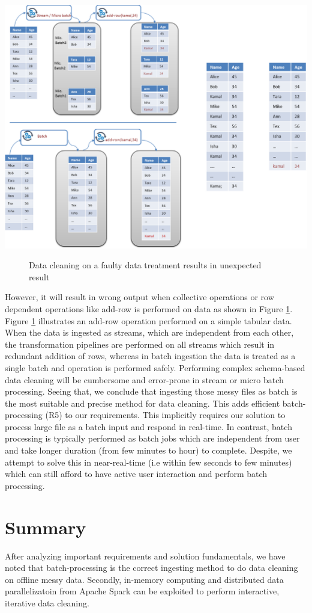  \begin{center}
	\includegraphics[width=38em]{./Figures/batch-cleaning-wrong}
	\begin{figure}[htbp]
    \caption{Data cleaning on a faulty data treatment results in unexpected result}
    \label{fig:stream-wrong}
	\end{figure}
\end{center}
 However, it will result in wrong output when collective operations or row dependent operations like add-row is performed on data as shown in Figure \ref{fig:stream-wrong}. Figure \ref{fig:stream-wrong} illustrates an add-row operation performed on a simple tabular data. When the data is ingested as streams, which are independent from each other, the transformation pipelines are performed on all streams which result in redundant addition of rows, whereas in batch ingestion the data is treated as a single batch and operation is performed safely. Performing complex schema-based data cleaning will be cumbersome and error-prone in stream or micro batch processing. Seeing that, we conclude that ingesting those messy files as batch is the most suitable and precise method for data cleaning. This adds efficient batch-processing (R5) to our requirements. This implicitly requires our solution to process large file as a batch input and respond in real-time. In contrast, batch processing is typically performed as batch jobs which are independent from user \cite{beyondbatchprocessing} and take longer duration (from few minutes to hour) to complete. Despite, we attempt to solve this in near-real-time (i.e within few seconds to few minutes) which can still afford to have active user interaction and perform batch processing. 
\section{Summary}
After analyzing important requirements and solution fundamentals, we have noted that batch-processing is the correct ingesting method to do data cleaning on offline messy data. Secondly, in-memory computing and distributed data parallelizatoin from Apache Spark can be exploited to perform interactive, iterative data cleaning. 